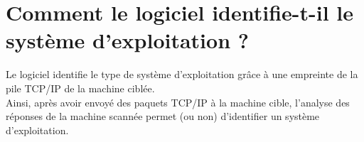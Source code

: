 \section{Comment le logiciel identifie-t-il le système d’exploitation ?}

Le logiciel identifie le type de système d'exploitation grâce à une empreinte de la pile TCP/IP de la machine ciblée. \\
\indent Ainsi, après avoir envoyé des paquets TCP/IP à la machine cible, l'analyse des réponses de la machine scannée permet (ou non) d'identifier un système d'exploitation.